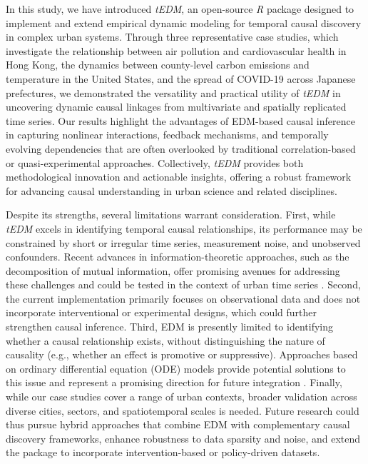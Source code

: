 \documentclass[authoryear,preprint,review,12pt]{elsarticle}
\begin{document}
In this study, we have introduced \textit{tEDM}, an open-source \textit{R} package designed to implement and extend empirical dynamic modeling for temporal causal discovery in complex urban systems. Through three representative case studies, which investigate the relationship between air pollution and cardiovascular health in Hong Kong, the dynamics between county-level carbon emissions and temperature in the United States, and the spread of COVID-19 across Japanese prefectures, we demonstrated the versatility and practical utility of \textit{tEDM} in uncovering dynamic causal linkages from multivariate and spatially replicated time series. Our results highlight the advantages of EDM-based causal inference in capturing nonlinear interactions, feedback mechanisms, and temporally evolving dependencies that are often overlooked by traditional correlation-based or quasi-experimental approaches. Collectively, \textit{tEDM} provides both methodological innovation and actionable insights, offering a robust framework for advancing causal understanding in urban science and related disciplines.

Despite its strengths, several limitations warrant consideration. First, while \textit{tEDM} excels in identifying temporal causal relationships, its performance may be constrained by short or irregular time series, measurement noise, and unobserved confounders. Recent advances in information-theoretic approaches, such as the decomposition of mutual information, offer promising avenues for addressing these challenges and could be tested in the context of urban time series \citep{sanchez2024surd}. Second, the current implementation primarily focuses on observational data and does not incorporate interventional or experimental designs, which could further strengthen causal inference. Third, EDM is presently limited to identifying whether a causal relationship exists, without distinguishing the nature of causality (e.g., whether an effect is promotive or suppressive). Approaches based on ordinary differential equation (ODE) models provide potential solutions to this issue and represent a promising direction for future integration \citep{park2023gobi}. Finally, while our case studies cover a range of urban contexts, broader validation across diverse cities, sectors, and spatiotemporal scales is needed. Future research could thus pursue hybrid approaches that combine EDM with complementary causal discovery frameworks, enhance robustness to data sparsity and noise, and extend the package to incorporate intervention-based or policy-driven datasets. 
\end{document}
